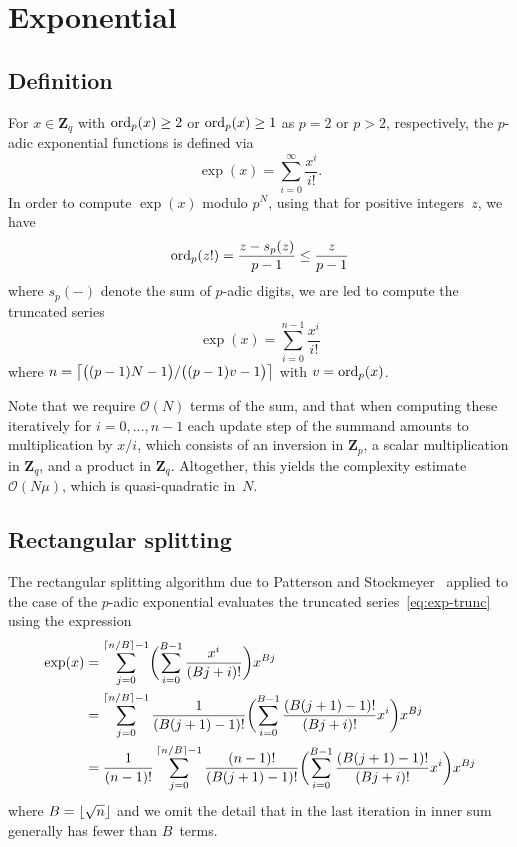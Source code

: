 \section{Exponential}

\subsection{Definition}

For $x \in \mathbf{Z}_q$ with $\operatorname{ord}_p(x) \geq 2$ or $\operatorname{ord}_p(x) \geq 1$ 
as $p=2$ or $p > 2$, respectively, the $p$-adic exponential functions is 
defined via 
\begin{equation}
\exp(x) = \sum_{i = 0}^{\infty} \frac{x^i}{i!}.
\end{equation}
In order to compute $\exp(x)$ modulo $p^N$, using that for positive 
integers~$z$, we have
\begin{equation}
\operatorname{ord}_p(z!) = \frac{z - s_p(z)}{p - 1} \leq \frac{z}{p - 1}
\end{equation}
where $s_p(-)$ denote the sum of $p$-adic digits, we are led to compute 
the truncated series 
\begin{equation} \label{eq:exp-trunc}
\exp(x) = \sum_{i = 0}^{n-1} \frac{x^i}{i!}
\end{equation}
where $n = \bigl\lceil\bigl( (p-1)N - 1 \bigr) / \bigl( (p-1)v - 1 \bigr)\bigr\rceil$ 
with $v = \operatorname{ord}_p(x)$.

Note that we require $\mathcal{O}(N)$ terms of the sum, 
and that when computing these iteratively for $i = 0, \dotsc, n-1$ 
each update step of the summand amounts to multiplication by $x / i$, 
which consists of an inversion in $\mathbf{Z}_p$, a scalar multiplication 
in $\mathbf{Z}_q$, and a product in $\mathbf{Z}_q$.  Altogether, this 
yields the complexity estimate $\mathcal{O}(N \mu)$, which is quasi-quadratic 
in~$N$.

\subsection{Rectangular splitting}

The rectangular splitting algorithm due to Patterson and 
Stockmeyer~\citep{PatersonStockmeyer1973} applied to the 
case of the $p$-adic exponential evaluates the truncated 
series~\eqref{eq:exp-trunc} using the expression 
\begin{align}
\exp(x) & = \sum_{j=0}^{\left\lceil n/B\right\rceil - 1} 
            \biggl( \sum_{i=0}^{B-1} \frac{x^i}{(Bj + i)!} \biggr) x^{Bj} \\
        & = \sum_{j=0}^{\left\lceil n/B\right\rceil - 1} 
            \frac{1}{(B (j+1) - 1)!} \biggl( \sum_{i=0}^{B-1} \frac{(B (j+1) - 1)!}{(Bj + i)!} x^i \biggr) x^{Bj} \\
        & = \frac{1}{(n-1)!} \sum_{j=0}^{\left\lceil n/B\right\rceil - 1} 
            \frac{(n-1)!}{(B (j+1) - 1)!} \biggl( \sum_{i=0}^{B-1} \frac{(B (j+1) - 1)!}{(Bj + i)!} x^i \biggr) x^{Bj}
\end{align}
where $B = \lfloor\sqrt{n}\rfloor$ and we omit the detail that 
in the last iteration in inner sum generally has fewer than 
$B$~terms.

